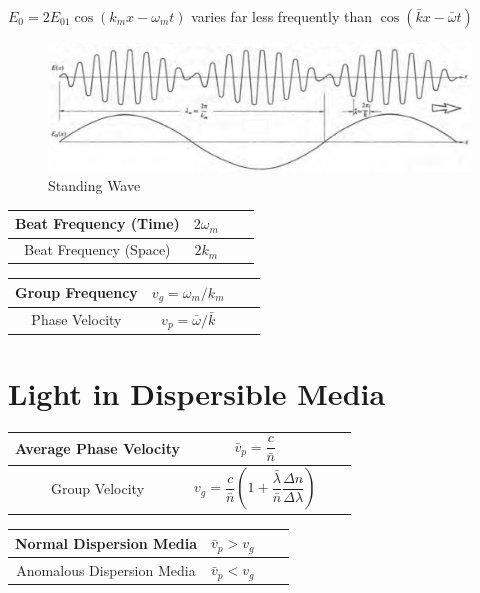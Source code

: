 $E_0 = 2 E_{01} \cos \left( k_m x - \omega_m t \right)$ varies far less frequently than $\cos \left( \bar{k} x - \bar{\omega} t \right)$

\begin{figure}[H]
  \centering
  \includegraphics[width=\linewidth]{figures/Standing-Wave}
  \caption{Standing Wave}
  \label{fig:}
\end{figure}

\begin{table}[h]
  \centering
  \begin{tabular}{|Sc|Sc|}
    \hline
    Beat Frequency (Time) & $2 \omega_m $ \\
    \hline
    Beat Frequency (Space) & $ 2 k_m $ \\
    \hline
  \end{tabular}
  \quad\quad\quad\quad
  \begin{tabular}{|Sc|Sc|}
    \hline
    Group Frequency & $v_g = \omega_m / k_m $ \\
    \hline
    Phase Velocity & $ v_p = \bar{\omega} / \bar{k}$ \\
    \hline
  \end{tabular}
\end{table}

\section{Light in Dispersible Media}

\begin{table}[h]
  \centering
  \begin{tabular}{|Sc|Sc|}
    \hline
    Average Phase Velocity & $\bar{v}_p = \dfrac{c}{\bar{n}} $ \\
    \hline
    Group Velocity & $v_g = \dfrac{c}{\bar{n}} \left( 1 + \dfrac{\bar{\lambda}}{\bar{n}} \dfrac{\Delta n}{\Delta \lambda}   \right) $ \\
    \hline
  \end{tabular}
  \quad\quad\quad\quad
  \begin{tabular}{|Sc|Sc|}
    \hline
    Normal Dispersion Media & $\bar{v}_p > v_g $ \\
    \hline
    Anomalous Dispersion Media & $ \bar{v}_p < v_g $ \\
    \hline
  \end{tabular}

\end{table}


